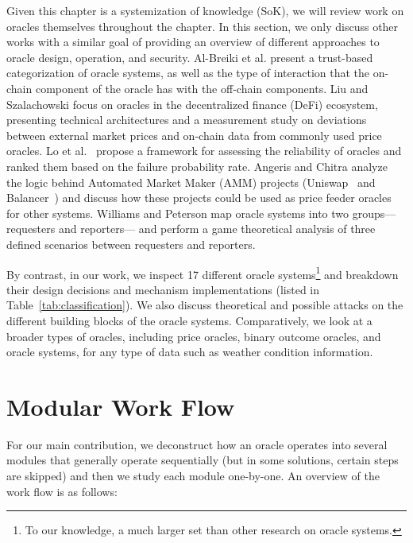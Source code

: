 Given this chapter is a systemization of knowledge (SoK), we will review work on oracles themselves throughout the chapter. In this section, we only discuss other works with a similar goal of providing an overview of different approaches to oracle design, operation, and security. Al-Breiki et al. \cite{al2020trustworthy} present a trust-based categorization of oracle systems, as well as the type of interaction that the on-chain component of the oracle has with the off-chain components. 
Liu and Szalachowski \cite{liu2020first} focus on oracles in the decentralized finance (DeFi) ecosystem, presenting technical architectures and a measurement study on deviations between external market prices and on-chain data from commonly used price oracles.
Lo et al.~\cite{lo2020reliability} propose a framework for assessing the reliability of oracles and ranked them based on the failure probability rate.
Angeris and Chitra \cite{angeris2020improved} analyze the logic behind Automated Market Maker (AMM) projects (\eg Uniswap~\cite{adams2019uniswap} and Balancer~\cite{balancer}) and discuss how these projects could be used as price feeder oracles for other systems.
Williams and Peterson \cite{williams2019decentralized} map oracle systems into two groups---requesters and reporters--- and perform a game theoretical analysis of three defined scenarios between requesters and reporters.

By contrast, in our work, we inspect 17 different oracle systems\footnote{To our knowledge, a much larger set than other research on oracle systems.} and breakdown their design decisions and mechanism implementations (listed in Table~\ref{tab:classification}). We also discuss theoretical and possible attacks on the different building blocks of the oracle systems. Comparatively, we look at a broader types of oracles, including price oracles, binary outcome oracles, and oracle systems, for any type of data such as weather condition information.




\section{Modular Work Flow} \label{overview_workflow}

For our main contribution, we deconstruct how an oracle operates into several modules that generally operate sequentially (but in some solutions, certain steps are skipped) and then we study each module one-by-one. An overview of the work flow is as follows:


